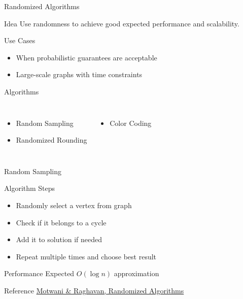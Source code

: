 \documentclass[aspectratio=169]{beamer}
\begin{document}
\begin{frame}{Randomized Algorithms}

\begin{block}{Idea}
Use randomness to achieve good expected performance and scalability.
\end{block}

\vspace{0.2cm}

\begin{exampleblock}{Use Cases}
\begin{itemize}
\item When probabilistic guarantees are acceptable
\item Large-scale graphs with time constraints
\end{itemize}
\end{exampleblock}

\vspace{0.2cm}

\begin{alertblock}{Algorithms}

\begin{columns}[T]
\begin{itemize}
\item Random Sampling
\item Randomized Rounding
\end{itemize}

\begin{itemize}
\item Color Coding
\end{itemize}

\end{columns}

\end{alertblock}

\end{frame}

\begin{frame}{Random Sampling}

\begin{block}{Algorithm Steps}
\begin{itemize}
\item Randomly select a vertex from graph
\item Check if it belongs to a cycle
\item Add it to solution if needed
\item Repeat multiple times and choose best result
\end{itemize}
\end{block}

\begin{exampleblock}{Performance}
Expected $O(\log n)$ approximation
\end{exampleblock}

\begin{alertblock}{Reference}
\href{https://doi.org/10.1017/CBO9780511814075}{Motwani \& Raghavan, Randomized Algorithms}
\end{alertblock}

\end{frame}
\end{document}
